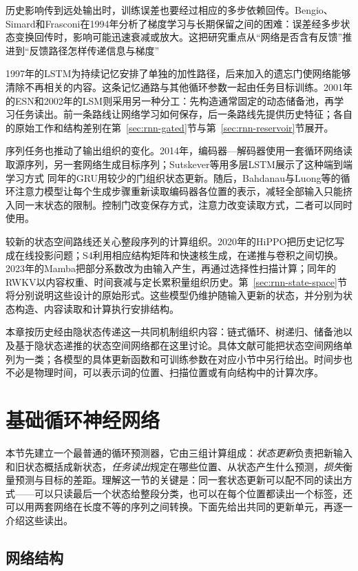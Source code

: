 历史影响传到远处输出时，训练误差也要经过相应的多步依赖回传。Bengio、Simard和Frasconi在1994年分析了梯度学习与长期保留之间的困难：误差经多步状态变换回传时，影响可能迅速衰减或放大。这把研究重点从“网络是否含有反馈”推进到“反馈路径怎样传递信息与梯度”

1997年的LSTM为持续记忆安排了单独的加性路径，后来加入的遗忘门使网络能够清除不再相关的内容。这条记忆通路与其他循环参数一起由任务目标训练。2001年的ESN和2002年的LSM则采用另一种分工：先构造通常固定的动态储备池，再学习任务读出。前一条路线让网络学习如何保存，后一条路线先提供历史特征；各自的原始工作和结构差别在第~\ref{sec:rnn-gated}节与第~\ref{sec:rnn-reservoir}节展开。

序列任务也推动了输出组织的变化。2014年，编码器—解码器使用一套循环网络读取源序列，另一套网络生成目标序列；Sutskever等用多层LSTM展示了这种端到端学习方式 同年的GRU用较少的门组织状态更新。随后，Bahdanau与Luong等的循环注意力模型让每个生成步骤重新读取编码器各位置的表示，减轻全部输入只能挤入同一末状态的限制。控制门改变保存方式，注意力改变读取方式，二者可以同时使用。

较新的状态空间路线还关心整段序列的计算组织。2020年的HiPPO把历史记忆写成在线投影问题；S4利用相应结构矩阵和快速核生成，在递推与卷积之间切换。2023年的Mamba把部分系数改为由输入产生，再通过选择性扫描计算；同年的RWKV以内容权重、时间衰减与定长累积量组织历史。第~\ref{sec:rnn-state-space}节将分别说明这些设计的原始形式。这些模型仍维护随输入更新的状态，并分别为状态构造、内容读取和计算执行安排结构。

本章按历史经由隐状态传递这一共同机制组织内容：链式循环、树递归、储备池以及基于隐状态递推的状态空间网络都在这里讨论。具体文献可能把状态空间网络单列为一类；各模型的具体更新函数和可训练参数在对应小节中另行给出。时间步也不必是物理时间，可以表示词的位置、扫描位置或有向结构中的计算次序。

\FloatBarrier
\section{基础循环神经网络}
\label{sec:rnn-basic}

本节先建立一个最普通的循环预测器，它由三组计算组成：\emph{状态更新}负责把新输入和旧状态概括成新状态，\emph{任务读出}规定在哪些位置、从状态产生什么预测，\emph{损失}衡量预测与目标的差距。理解这一节的关键是：同一套状态更新可以配不同的读出方式——可以只读最后一个状态给整段分类，也可以在每个位置都读出一个标签，还可以用两套网络在长度不等的序列之间转换。下面先给出共同的更新单元，再逐一介绍这些读出。

\subsection{网络结构}
\label{sec:rnn-structure}

